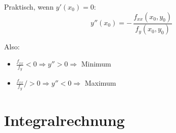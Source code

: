 \documentclass[a4paper,11pt,oneside,open=any,parskip=half, DIV=15]{scrreprt}
\begin{document}
         Praktisch, wenn \(y'(x_0)=0\):
         \[
            y''(x_0) = -\,\frac{f_{xx}(x_0,y_0)}{f_y(x_0,y_0)}
         \]

         Also:
         \begin{itemize}
            \item \(\frac{f_{xx}}{f_y} < 0 \Rightarrow y''>0 \Rightarrow\) Minimum
            \item \(\frac{f_{xx}}{f_y}/ > 0 \Rightarrow y''<0 \Rightarrow\) Maximum
         \end{itemize}

\chapter{Integralrechnung}
\end{document}

